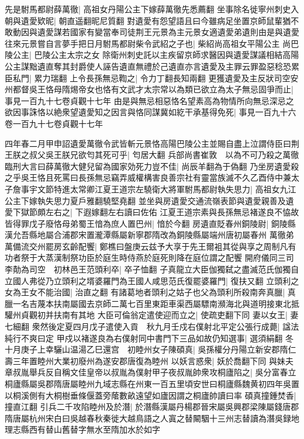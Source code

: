 先是駙馬都尉薛萬徹|{
	高祖女丹陽公主下嫁薛萬徹先悉薦翻}
坐事除名徙寧州刺史入朝與遺愛欵昵|{
	朝直遥翻昵尼質翻}
對遺愛有怨望語且曰今雖病足坐置京師鼠輩猶不敢動因與遺愛謀若國家有變當奉司徒荆王元景為主元景女適遺愛弟遺則由是與遺愛往來元景嘗自言夢手把日月駙馬都尉柴令武紹之子也|{
	柴紹尚高祖女平陽公主}
尚巴陵公主|{
	巴陵公主太宗之女}
除衛州刺史託以主疾留京師求醫因與遺愛謀議相結高陽公主謀黜遺直奪其封爵使人誣告遺直無禮於己遺直亦言遺愛及主罪云罪盈惡稔恐累臣私門|{
	累力瑞翻}
上令長孫無忌鞫之|{
	令力丁翻長知兩翻}
更獲遺愛及主反狀司空安州都督吳王恪母隋焬帝女也恪有文武才太宗常以為類已欲立為太子無忌固爭而止|{
	事見一百九十七卷貞觀十七年}
由是與無忌相惡恪名望素高為物情所向無忌深忌之欲因事誅恪以絶衆望遺愛知之因言與恪同謀冀如紇干承基得免死|{
	事見一百九十六卷一百九十七卷貞觀十七年}


四年春二月甲申詔遺愛萬徹令武皆斬元景恪高陽巴陵公主並賜自盡上泣謂侍臣曰荆王朕之叔父吳王朕兄欲匄其死可乎|{
	匄居大翻}
兵部尚書崔敦　以為不可乃殺之萬徹臨刑大言曰薛萬徹大健兒留為國家効死力豈不佳|{
	尚辰羊翻為于偽翻}
乃坐房遺愛殺之乎吳王恪且死罵曰長孫無忌竊弄威權構害良善宗社有靈當族滅不久乙酉侍中兼太子詹事宇文節特進太常卿江夏王道宗左驍衛大將軍駙馬都尉執失思力|{
	高祖女九江公主下嫁執失思力夏戶雅翻驍堅堯翻}
並坐與房遺愛交通流嶺表節與遺愛親善及遺愛下獄節頗左右之|{
	下遐嫁翻左右讀曰佐佑}
江夏王道宗素與長孫無忌褚遂良不恊故皆得罪戊子廢恪母弟蜀王愔為庶人置巴州|{
	愔於今翻}
房遺直貶春州銅陵尉|{
	銅陵縣漢允吾縣地屬合浦郡宋置瀧潭縣屬新寧郡隋改為銅陵縣屬端州唐初屬春州}
萬徹弟萬備流交州罷房玄齡配饗|{
	鄭樵曰盤庚云兹予大享于先王爾袓其從與享之周制凡有功者祭于大蒸漢制祭功臣於庭生時侍燕於庭死則降在庭位謂之配饗}
開府儀同三司李勣為司空　初林邑王范頭利卒|{
	卒子恤翻}
子真龍立大臣伽獨弑之盡滅范氏伽獨自立國人弗從乃立頭利之壻婆羅門為王國人咸思范氏復罷婆羅門|{
	復扶又翻}
立頭利之女為王女不能治國|{
	治直之翻}
有諸葛地者頭利之姑子也父為頭利所殺南奔真臘|{
	真臘一名吉蔑本扶南屬國去京師二萬七百里東距車渠西屬驃南瀕海北與道明接東北抵驩州貞觀初并扶南有其地}
大臣可倫翁定遣使迎而立之|{
	使疏吏翻下同}
妻以女王|{
	妻七細翻}
衆然後定夏四月戊子遣使入貢　秋九月壬戍右僕射北平定公張行成薨|{
	諡法純行不爽曰定}
甲戍以褚遂良為右僕射同中書門下三品如故仍知選事|{
	選須絹翻}
冬十月庚子上幸驪山温湯乙巳還宫　初睦州女子陳碩真|{
	吳孫權分丹陽立新安郡隋仁壽三年置睦州大業初廢州為遂安郡唐復為睦州}
以妖言惑衆|{
	妖於喬翻下同}
與妹夫章叔胤舉兵反自稱文佳皇帝以叔胤為僕射甲子夜叔胤帥衆攻桐廬陷之|{
	吳分富春立桐廬縣屬吳郡隋唐屬睦州九域志縣在州東一百五里頃安世曰桐廬縣魏黄初四年吳置以桐溪側有大桐樹垂條偃蓋旁䕃數畝遠望如廬因謂之桐廬帥讀曰率}
碩真撞鍾焚香|{
	撞直江翻}
引兵二千攻陷睦州及於潛|{
	於潛縣漢屬丹楊郡晉宋屬吳興郡梁陳屬錢唐郡隋唐屬杭州宋白曰吳越春秋秦徙大越鳥語之人寘之替闞駰十三州志替讀為潛吳録地理志縣西有替山舊替字無水至隋加水於如字}
